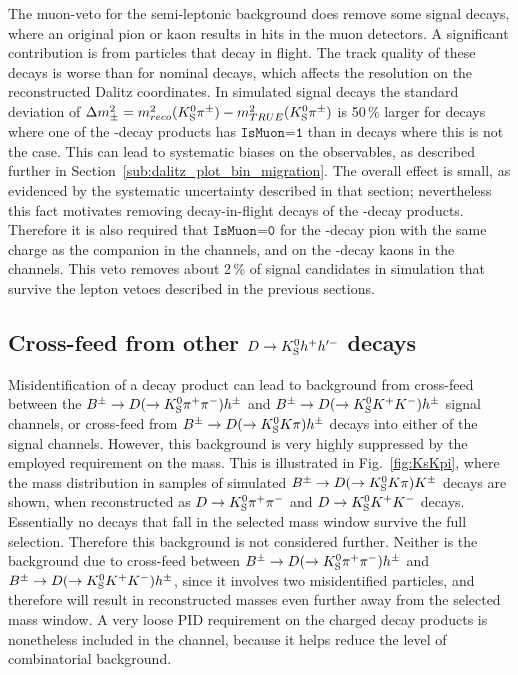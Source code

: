 

The muon-veto for the semi-leptonic background does remove some signal decays, where an original pion or kaon results in hits in the muon detectors. A significant contribution is from particles that decay in flight. The track quality of these decays is worse than for nominal decays, which affects the resolution on the reconstructed Dalitz coordinates. In simulated signal decays the standard deviation of $\Delta m^2_\pm = m^2_{reco}({{K}^0_{\mathrm{S}}}{{\pi}^\pm})-m^2_{TRUE}({{K}^0_{\mathrm{S}}}{{\pi}^\pm})$ is 50\,\% larger for decays where one of the \D-decay products has $\texttt{IsMuon=1}$ than in decays where this is not the case. This can lead to systematic biases on the observables, as described further in Section~\ref{sub:dalitz_plot_bin_migration}. The overall effect is small, as evidenced by the systematic uncertainty described in that section; nevertheless this fact motivates removing decay-in-flight decays of the \D-decay products. Therefore it is also required that $\texttt{IsMuon=0}$ for the \D-decay pion with the same charge as the companion in the \DtoKspipi channels, and on the \D-decay kaons in the \DtoKskk channels. This veto removes about 2\,\% of signal candidates in simulation that survive the lepton vetoes described in the previous sections.


\subsection{\texorpdfstring{Cross-feed from other ${D}\rightarrow{\ensuremath{{K}^0_{\mathrm{S}}}} h^+h'^-$ decays}{Cross-feed from other D->KShh' decays}} %
\label{sub:cross_feed_from_other_d_kshh_decays}

Misidentification of a \D decay product can lead to background from cross-feed between the ${{{B}^\pm}\rightarrow{\ensuremath{D}}(\rightarrow{\ensuremath{{K}^0_{\mathrm{S}}}}{\ensuremath{{\pi}^+}}{\ensuremath{{\pi}^-}})h^\pm}$ and ${{{B}^\pm}\rightarrow{\ensuremath{D}}(\rightarrow{\ensuremath{{K}^0_{\mathrm{S}}}}{\ensuremath{{K}^+}}{\ensuremath{{K}^-}})h^\pm}$ signal channels, or cross-feed from ${{{B}^\pm}\rightarrow{\ensuremath{D}}(\rightarrow{\ensuremath{{K}^0_{\mathrm{S}}}}{\ensuremath{K}}\pi)h^\pm}$ decays into either of the signal channels. However, this background is very highly suppressed by the employed requirement on the \D mass. This is illustrated in Fig.~\ref{fig:KsKpi}, where the \D mass distribution in samples of simulated ${{B}^\pm}\rightarrow{\ensuremath{D}}(\rightarrow{\ensuremath{{K}^0_{\mathrm{S}}}}{\ensuremath{K}}\pi){K}^\pm$  decays are shown, when reconstructed as ${D}\rightarrow{\ensuremath{{K}^0_{\mathrm{S}}}}{\ensuremath{{\pi}^+}}{\ensuremath{{\pi}^-}}$ and ${D}\rightarrow{\ensuremath{{K}^0_{\mathrm{S}}}}{\ensuremath{{K}^+}}{\ensuremath{{K}^-}}$ decays. Essentially no decays that fall in the selected \D mass window survive the full selection. Therefore this background is not considered further. Neither is the background due to cross-feed between ${{B}^\pm}\rightarrow{\ensuremath{D}}(\rightarrow{\ensuremath{{K}^0_{\mathrm{S}}}}{\ensuremath{{\pi}^+}}{\ensuremath{{\pi}^-}})h^\pm$ and ${{B}^\pm}\rightarrow{\ensuremath{D}}(\rightarrow{\ensuremath{{K}^0_{\mathrm{S}}}}{\ensuremath{{K}^+}}{\ensuremath{{K}^-}})h^\pm$, since it involves two misidentified particles, and therefore will result in reconstructed \D masses even further away from the selected mass window. A very loose PID requirement on the charged \D decay products is nonetheless included in the \DtoKsKK channel, because it helps reduce the level of combinatorial background.

